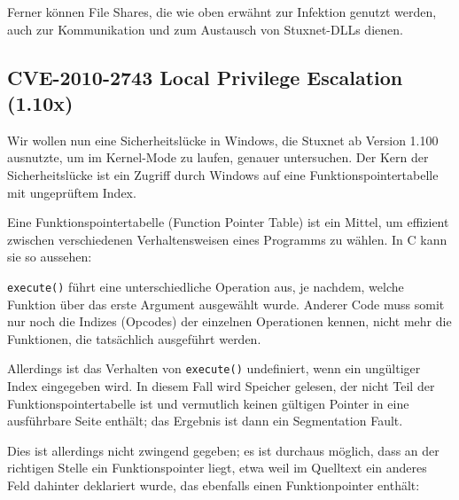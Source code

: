 \documentclass{article}
\begin{document}
Ferner können File Shares, die wie oben erwähnt zur Infektion genutzt werden,
auch zur Kommunikation und zum Austausch von Stuxnet-DLLs dienen.

\subsection{CVE-2010-2743 Local Privilege Escalation (1.10x)}

Wir wollen nun eine Sicherheitslücke in Windows, die Stuxnet ab Version 1.100 ausnutzte, um im Kernel-Mode zu laufen, genauer untersuchen.
Der Kern der Sicherheitslücke ist ein Zugriff durch Windows auf eine Funktionspointertabelle mit ungeprüftem Index.

Eine Funktionspointertabelle (Function Pointer Table) ist ein Mittel,
um effizient zwischen verschiedenen Verhaltensweisen eines Programms zu wählen.
In C kann sie so aussehen:



\texttt{execute()} führt eine unterschiedliche Operation aus, je nachdem, welche Funktion über das erste Argument ausgewählt wurde.
Anderer Code muss somit nur noch die Indizes (Opcodes) der einzelnen Operationen kennen, nicht mehr die Funktionen, die tatsächlich ausgeführt werden.

Allerdings ist das Verhalten von \texttt{execute()} undefiniert, wenn ein ungültiger Index eingegeben wird.
In diesem Fall wird Speicher gelesen, der nicht Teil der Funktionspointertabelle ist und vermutlich keinen gültigen Pointer in eine ausführbare Seite enthält;
das Ergebnis ist dann ein Segmentation Fault.



Dies ist allerdings nicht zwingend gegeben; es ist durchaus möglich, dass an der richtigen Stelle ein Funktionspointer liegt,
etwa weil im Quelltext ein anderes Feld dahinter deklariert wurde, das ebenfalls einen Funktionpointer enthält:


\end{document}
